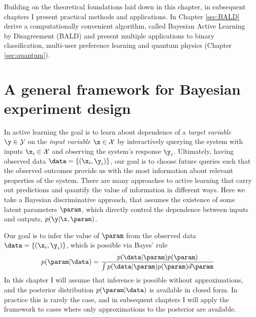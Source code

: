 Building on the theoretical foundations laid down in this chapter, in subsequent chapters I present practical methods and applications. In Chapter \ref{sec:BALD} derive a computationally convenient algorithm, called Bayesian Active Learning by Disagreement (BALD) and present multiple applications to binary classification, multi-user preference learning and quantum physics (Chapter \ref{sec:quantum}).

                                                      
\section{A general framework for Bayesian experiment design}

In active learning the goal is to learn about dependence of a \emph{target variable} $\y\in\mathcal{Y}$ on the \emph{input variable} $\x\in\mathcal{X}$ by interactively querying the system with inputs $\x_i\in\mathcal{X}$ and observing the system's response $\y_i$. Ultimately, having observed data $\data = \{(\x_i,\y_i)\}$, our goal is to choose future queries such that the observed outcomes provide us with the most information about relevant properties of the system. There are many approaches to active learning that carry out predictions and quantify the value of information in different ways. Here we take a Bayesian discriminative approach, that assumes the existence of some latent parameters $\param$, which directly control the dependence between inputs and outputs, $p(\y\vert\x,\param)$.

Our goal is to infer the value of $\param$ from the observed data $\data = \{(\x_i,\y_i)\}$, which is possible via Bayes' rule
\begin{equation}
	p(\param\vert\data) = \frac{p(\data\vert\param)p(\param)}{\int p(\data\vert\param)p(\param) d\param}
\end{equation}
In this chapter I will assume that inference is possible without approximations, and the posterior distribution $p(\param\vert\data)$ is available in closed form. In practice this is rarely the case, and in subsequent chapters I will apply the framework to cases where only approximations to the posterior are available.

